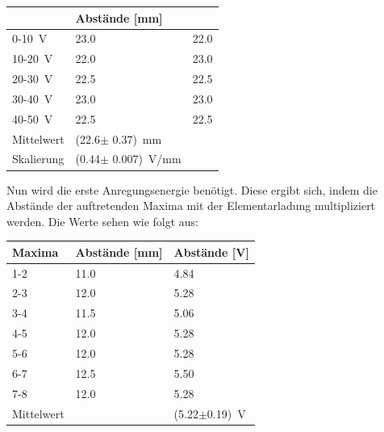 \begin{minipage}{\linewidth}
    \begin{table}[H]
        \centering
    \begin{tabular}{lll}
        \toprule
         & Abstände [mm]\\
        \midrule
        0-10\, V & 23.0 & 22.0 \\
        10-20\, V & 22.0 & 23.0 \\
        20-30\, V & 22.5 & 22.5\\
        30-40\, V & 23.0 & 23.0\\
        40-50\, V & 22.5 & 22.5\\
        \midrule
        Mittelwert& (22.6$\pm$ 0.37)\, mm \\
        Skalierung& (0.44$\pm$ 0.007)\, V/mm  \\       
    \end{tabular}
    
    \label{tab:5}
    \end{table}
\end{minipage}

\noindent Nun wird die erste Anregungsenergie benötigt. Diese ergibt sich, indem die Abstände der auftretenden Maxima mit der Elementarladung multipliziert werden.
Die Werte sehen wie folgt aus:

\begin{minipage}{\linewidth}
    \begin{table}[H]
        \centering
    \begin{tabular}{lll}
        \toprule
        Maxima & Abstände [mm] & Abstände [V]\\
        \midrule
        1-2 & 11.0 &   4.84 \\
        2-3 & 12.0 &   5.28\\
        3-4 & 11.5 & 5.06\\
        4-5 & 12.0 &   5.28\\
        5-6 & 12.0 &   5.28\\
        6-7 & 12.5 & 5.50\\
        7-8 & 12.0 &   5.28\\
        \midrule
        Mittelwert & & (5.22$\pm$0.19)\, V      
    \end{tabular}
    
    \label{tab:4}
    \end{table}
\end{minipage}

